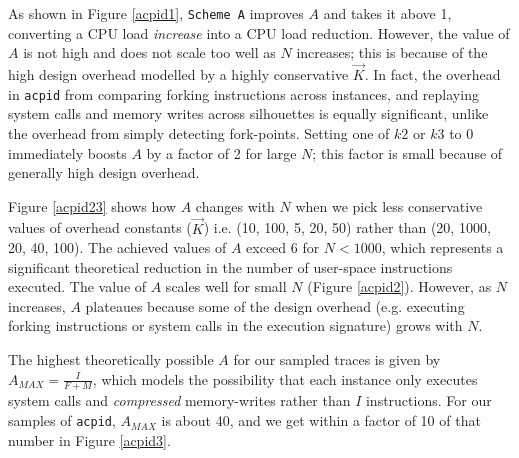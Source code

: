 As shown in Figure \ref{acpid1}, \texttt{Scheme A} improves $A$ and
takes it above 1, converting a CPU load {\em increase}
into a CPU load reduction. However, the value of $A$ is not high
and does not scale too well as $N$ increases;
this is because of the high design overhead 
modelled by a highly conservative $\vec K$. In fact, the overhead 
in \texttt{acpid} from comparing forking instructions across instances, and replaying system calls and memory writes
across silhouettes is equally significant, unlike
the overhead from simply detecting fork-points.
Setting one of $k2$ or $k3$ to 0 immediately boosts $A$ by a factor of 2 for large $N$;
this factor is small because of generally high design overhead.

Figure \ref{acpid23} shows how $A$ changes with $N$ when we pick less conservative
values of overhead constants ($\vec K$) i.e. (10, 100, 5, 20, 50) 
rather than (20, 1000, 20, 40, 100). The achieved values of $A$ 
exceed 6 for $N < 1000$, which represents a significant
theoretical reduction in the number of user-space instructions
executed. The value of $A$ scales well for small $N$
(Figure \ref{acpid2}).
However, as $N$ increases, $A$ plateaues because some
of the design overhead (e.g. executing forking instructions or system
calls in the execution signature) grows with $N$. 

The highest theoretically possible
$A$ for our sampled traces is given by $A_{MAX} = \frac{I}{F+M}$,
which models the possibility that each instance only
executes system calls and {\em compressed} memory-writes
rather than $I$ instructions. For our samples of \texttt{acpid}, $A_{MAX}$ 
is about 40, and we get within a factor of 10 of that number in Figure \ref{acpid3}. 

